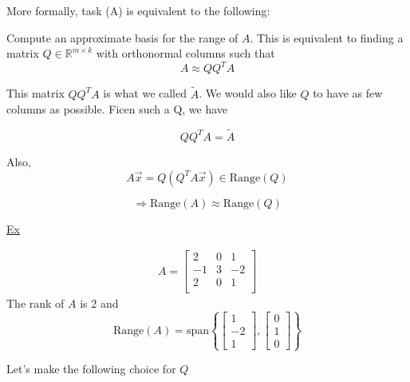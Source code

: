 More formally, task (A) is equivalent to the following:
\begin{displayquote}
    Compute an approximate basis for the range of $A$. This is equivalent to finding a matrix $Q\in\mathbb{R}^{m\times k}$ with orthonormal columns such that
    \begin{equation*}
        A \approx QQ^TA
    \end{equation*}
\end{displayquote}
This matrix $QQ^TA$ is what we called $\widetilde{A}$. We would also like $Q$ to have as few columns as possible. Ficen such a Q, we have

\begin{equation*}
    QQ^TA =  \widetilde{A}
\end{equation*}

Also,
\begin{equation*}
    A\vec{x} = Q\left(Q^TA\vec{x}\right) \in \text{Range}(Q)
\end{equation*}

\begin{equation*}
    \Rightarrow \text{Range}(A) \approx \text{Range}(Q)
\end{equation*}

\underline{Ex}

\begin{align*}
    A =
\begin{bmatrix}
    2 & 0 & 1 \\
    -1 & 3 & -2 \\
    2 & 0 & 1 \\
\end{bmatrix}
\end{align*}
The rank of $A$ is 2 and
\begin{equation*}
    \text{Range}(A) = \text{span}\left\{
\begin{bmatrix}
1\\-2\\1
\end{bmatrix},
\begin{bmatrix}
0\\1\\0
\end{bmatrix}
    \right\}
\end{equation*}

Let's make the following choice for $Q$

